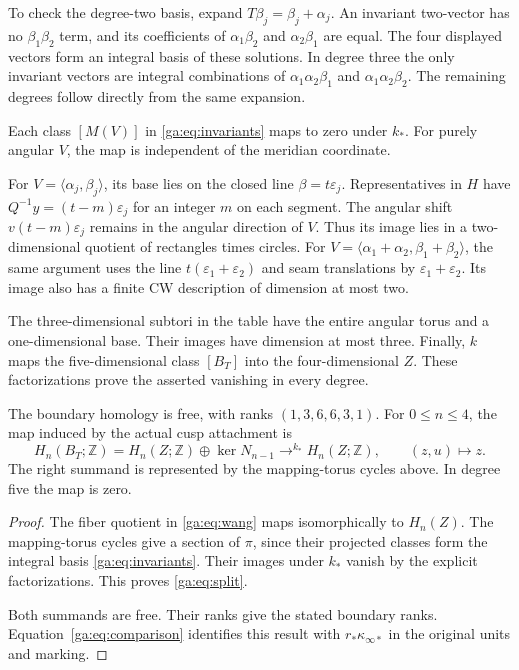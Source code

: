 To check the degree-two basis, expand $T\beta_j=\beta_j+\alpha_j$.
An invariant two-vector has no $\beta_1\beta_2$ term, and its coefficients
of $\alpha_1\beta_2$ and $\alpha_2\beta_1$ are equal.
The four displayed vectors form an integral basis of these solutions.
In degree three the only invariant vectors are integral combinations of
$\alpha_1\alpha_2\beta_1$ and $\alpha_1\alpha_2\beta_2$.
The remaining degrees follow directly from the same expansion.

Each class $[M(V)]$ in \eqref{ga:eq:invariants} maps to zero under $k_*$.
For purely angular $V$, the map is independent of the meridian coordinate.

For $V=\langle\alpha_j,\beta_j\rangle$, its base lies on the closed
line $\beta=t\varepsilon_j$. Representatives in $H$ have
$Q^{-1}y=(t-m)\varepsilon_j$ for an integer $m$ on each segment.
The angular shift $v(t-m)\varepsilon_j$ remains in the angular direction of $V$.
Thus its image lies in a two-dimensional quotient of rectangles times circles.
For $V=\langle\alpha_1+\alpha_2,\beta_1+\beta_2\rangle$, the same
argument uses the line $t(\varepsilon_1+\varepsilon_2)$ and seam translations
by $\varepsilon_1+\varepsilon_2$.
Its image also has a finite CW description of dimension at most two.

The three-dimensional subtori in the table have the entire angular torus
and a one-dimensional base. Their images have dimension at most three.
Finally, $k$ maps the five-dimensional class $[B_T]$ into the four-dimensional $Z$.
These factorizations prove the asserted vanishing in every degree.

\begin{theorem}\label{ga:thm:boundary}
The boundary homology is free, with ranks $(1,3,6,6,3,1)$.
For $0\leq n\leq4$, the map induced by the actual cusp attachment is
\begin{equation}\label{ga:eq:split}
H_n(B_T;\mathbb Z)=H_n(Z;\mathbb Z)\oplus\ker N_{n-1}
\mathrel{\mathop{\longrightarrow}^{k_*}}H_n(Z;\mathbb Z),
\qquad (z,u)\longmapsto z.
\end{equation}
The right summand is represented by the mapping-torus cycles above.
In degree five the map is zero.
\end{theorem}

\begin{proof}
The fiber quotient in \eqref{ga:eq:wang} maps isomorphically to $H_n(Z)$.
The mapping-torus cycles give a section of $\pi$, since their projected
classes form the integral basis \eqref{ga:eq:invariants}.
Their images under $k_*$ vanish by the explicit factorizations.
This proves \eqref{ga:eq:split}.

Both summands are free.
Their ranks give the stated boundary ranks.
Equation~\eqref{ga:eq:comparison} identifies this result with
$r_*\kappa_{\infty*}$ in the original units and marking.
\end{proof}

